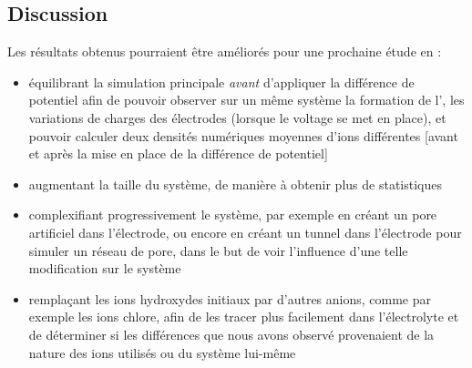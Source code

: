     \subsection{Discussion}

Les résultats obtenus pourraient être améliorés pour une prochaine étude en :
\begin{itemize}
    \item équilibrant la simulation principale \emph{avant} d'appliquer la différence de potentiel afin de pouvoir observer sur un même système la formation de l'\edl{}, les variations de charges des électrodes (lorsque le voltage se met en place), et pouvoir calculer deux densités numériques moyennes d'ions différentes [avant et après la mise en place de la différence de potentiel]
    \item augmentant la taille du système, de manière à obtenir plus de statistiques
    \item complexifiant progressivement le système, par exemple en créant un pore artificiel dans l'électrode, ou encore en créant un tunnel dans l'électrode pour simuler un réseau de pore, dans le but de voir l'influence d'une telle modification sur le système
    \item remplaçant les ions hydroxydes initiaux par d'autres anions, comme par exemple les ions chlore, afin de les tracer plus facilement dans l'électrolyte et de déterminer si les différences que nous avons observé provenaient de la nature des ions utilisés ou du système lui-même
\end{itemize}
